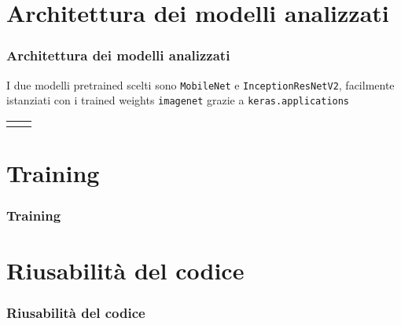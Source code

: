 \documentclass{beamer}
\newcommand{\dflvspace}{\vspace{10pt}}
\renewcommand{\footnotesize}{\tiny}
\newcommand{\dnnarch}[1]{
    \tikzset{
    	node/.style={draw, minimum width=4.2cm},
    	data/.style={align=center, minimum width=4.2cm}
	}

	\begin{tikzpicture}[node distance=0.35cm, auto, >=latex]
  		\node[data](data) {\footnotesize immagine 319x319 RGB};
    	\foreach \nd/\td/\cd [remember=\nd as \Nd (initially data)] in #1 {
        	\node [node, align=center, fill=\cd, below=of \Nd] (\nd) {\td};
        	\draw[->](\Nd)--(\nd);
    	}
    	\node[data, below=of out] (Data) {\footnotesize vettore di 10 probabilità};
    	\draw[->](out)--(Data);
    	
	\end{tikzpicture}
}
\begin{document}
\section{Architettura dei modelli analizzati}
\begin{frame}
    \frametitle{Architettura dei modelli analizzati}
    
    I due modelli pretrained scelti sono \texttt{MobileNet} e \texttt{InceptionResNetV2},
    facilmente istanziati con i trained weights \texttt{imagenet} grazie a \texttt{keras.applications}
    
    \dflvspace
    \dflvspace
    
    \begin{tabular}{c c}
    
    \def\firstlayers{
    	a/\tiny{Rescaling in $$[\,-1\,\dots\,1\,]$$ - 0 - $319\times 319\times 3$ }/white,
    	b/\tiny{MobileNet - $3.3M$ - $10\times 10\times 1024$}/cyan,
    	c/\tiny{GlobalAvgPool - $0$ - $1024$}/white,
    	d/\tiny{Dropout di $0.25$ - $0$ - $1024$}/white,
    	out/\tiny{Dense (softmax) - $10k$ - $10$} /white}
    
	\dnnarch{\firstlayers}
	
	&
	
	\def\secondlayers{
    	a/\tiny{Rescaling in $$[\,-1\,\dots\,1\,]$$ - 0 - $319\times 319\times 3$ }/white,
    	b/\tiny{InceptionResNetV2 - $54.3M$ - $8\times 8\times 1536$}/cyan,
    	c/\tiny{GlobalAvgPool - $0$ - $1536$}/white,
    	d/\tiny{Dropout di $0.4$ - $0$ - $1536$}/white,
    	out/\tiny{Dense (softmax) - $15k$ - $10$} /white}
    
	\dnnarch{\secondlayers}
	
	\end{tabular}
    
\end{frame}

\section{Training}
\begin{frame}
    \frametitle{Training}
    
    
\end{frame}

\section{Riusabilità del codice}
\begin{frame}
    \frametitle{Riusabilità del codice}
    
\end{frame}
\end{document}
